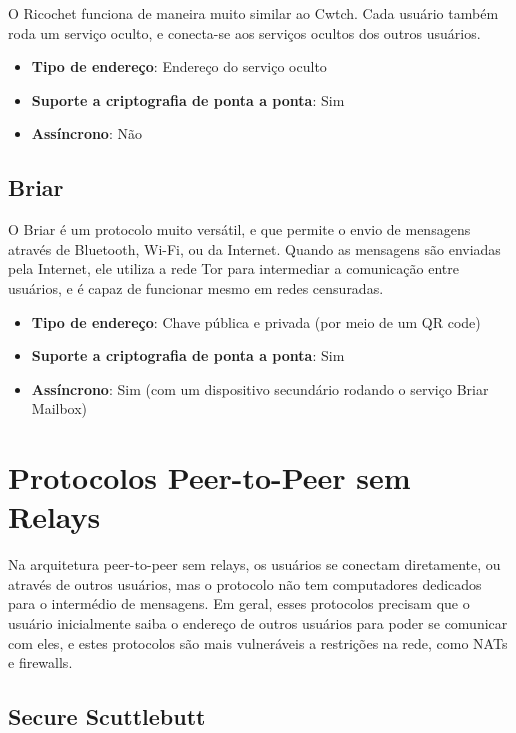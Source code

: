 O Ricochet funciona de maneira muito similar ao Cwtch. Cada usuário também roda um serviço oculto, e conecta-se aos serviços ocultos dos outros usuários. \cite{ricochet}

\begin{itemize}
  \item \textbf{Tipo de endereço}: Endereço do serviço oculto
  \item \textbf{Suporte a criptografia de ponta a ponta}: Sim
  \item \textbf{Assíncrono}: Não
\end{itemize}

\subsection{Briar}

O Briar é um protocolo muito versátil, e que permite o envio de mensagens através de Bluetooth, Wi-Fi, ou da Internet. Quando as mensagens são enviadas pela Internet, ele utiliza a rede Tor para intermediar a comunicação entre usuários, e é capaz de funcionar mesmo em redes censuradas. \cite{briar}

\begin{itemize}
  \item \textbf{Tipo de endereço}: Chave pública e privada (por meio de um QR code)
  \item \textbf{Suporte a criptografia de ponta a ponta}: Sim
  \item \textbf{Assíncrono}: Sim (com um dispositivo secundário rodando o serviço Briar Mailbox)
\end{itemize}

\section{Protocolos Peer-to-Peer sem Relays}

Na arquitetura peer-to-peer sem relays, os usuários se conectam diretamente, ou através de outros usuários, mas o protocolo não tem computadores dedicados para o intermédio de mensagens. Em geral, esses protocolos precisam que o usuário inicialmente saiba o endereço de outros usuários para poder se comunicar com eles, e estes protocolos são mais vulneráveis a restrições na rede, como NATs e firewalls.

\subsection{Secure Scuttlebutt}

